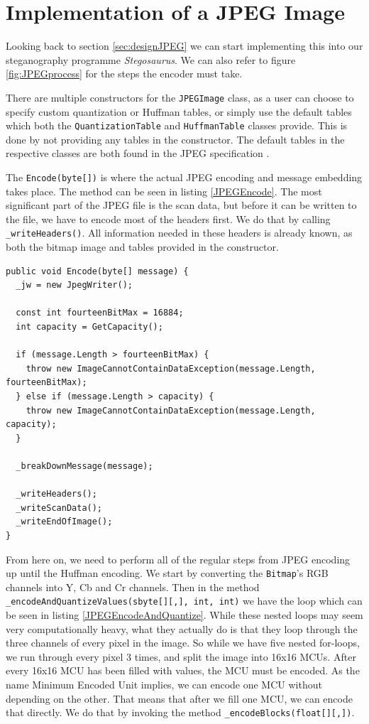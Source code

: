 \section{Implementation of a JPEG Image}
Looking back to section \ref{sec:designJPEG} we can start implementing this into our steganography programme \textit{Stegosaurus}.
We can also refer to figure \ref{fig:JPEGprocess} for the steps the encoder must take.

There are multiple constructors for the \lstinline|JPEGImage| class, as a user can choose to specify custom quantization or Huffman tables, or simply use the default tables which both the \lstinline|QuantizationTable| and \lstinline|HuffmanTable| classes provide. 
This is done by not providing any tables in the constructor.
The default tables in the respective classes are both found in the JPEG specification \citep[Annex k]{JPEGStandard}.

The \lstinline|Encode(byte[])| is where the actual JPEG encoding and message embedding takes place.
The method can be seen in listing \ref{JPEGEncode}.
The most significant part of the JPEG file is the scan data, but before it can be written to the file, we have to encode most of the headers first.
We do that by calling \lstinline|_writeHeaders()|.
All information needed in these headers is already known, as both the bitmap image and tables provided in the constructor.

\begin{lstlisting}[firstnumber=141,label=JPEGEncode, caption={\lstinline|JPEGImage.Encode| method \textbf{File: }JPEGImage.cs}]
public void Encode(byte[] message) {
  _jw = new JpegWriter();

  const int fourteenBitMax = 16884;
  int capacity = GetCapacity();

  if (message.Length > fourteenBitMax) {
    throw new ImageCannotContainDataException(message.Length, fourteenBitMax);
  } else if (message.Length > capacity) {
    throw new ImageCannotContainDataException(message.Length, capacity);
  }

  _breakDownMessage(message);

  _writeHeaders();
  _writeScanData();
  _writeEndOfImage();
}
\end{lstlisting}

From here on, we need to perform all of the regular steps from JPEG encoding up until the Huffman encoding.
We start by converting the \lstinline|Bitmap|'s RGB channels into Y, Cb and Cr channels. Then in the method \lstinline|_encodeAndQuantizeValues(sbyte[][,], int, int)| we have the loop which can be seen in listing \ref{JPEGEncodeAndQuantize}.
While these nested loops may seem very computationally heavy, what they actually do is that they loop through the three channels of every pixel in the image.
So while we have five nested for-loops, we run through every pixel 3 times, and split the image into 16x16 MCUs.
After every 16x16 MCU has been filled with values, the MCU must be encoded.
As the name Minimum Encoded Unit implies, we can encode one MCU without depending on the other.
That means that after we fill one MCU, we can encode that directly.
We do that by invoking the method \lstinline|_encodeBlocks(float[][,])|.

